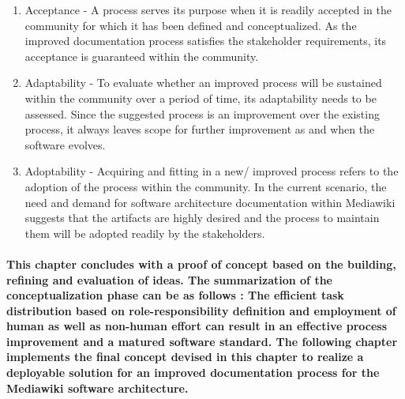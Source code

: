 \begin{itemize}
\begin{enumerate}
\item Acceptance - A process serves its purpose when it is readily accepted in the community for which it has been defined and conceptualized. As the improved documentation process satisfies the stakeholder requirements, its acceptance is guaranteed within the community. 
\item Adaptability - To evaluate whether an improved process will be sustained within the community over a period of time, its adaptability needs to be assessed. Since the suggested process is an improvement over the existing process, it always leaves scope for further improvement as and when the software evolves.
\item Adoptability - Acquiring and fitting in a new/ improved process refers to the adoption of the process within the community. In the current scenario, the need and demand for software architecture documentation within Mediawiki suggests that the artifacts are highly desired and the process to maintain them will be adopted readily by the stakeholders. 
\end{enumerate}
\end{itemize}

\paragraph{This chapter concludes with a proof of concept based on the building, refining and evaluation of ideas. The summarization of the conceptualization phase can be as follows : The efficient task distribution based on role-responsibility definition and employment of human as well as non-human effort can result in an effective process improvement and a matured software standard. The following chapter implements the final concept devised in this chapter to realize a deployable solution for an improved documentation process for the Mediawiki software architecture. }